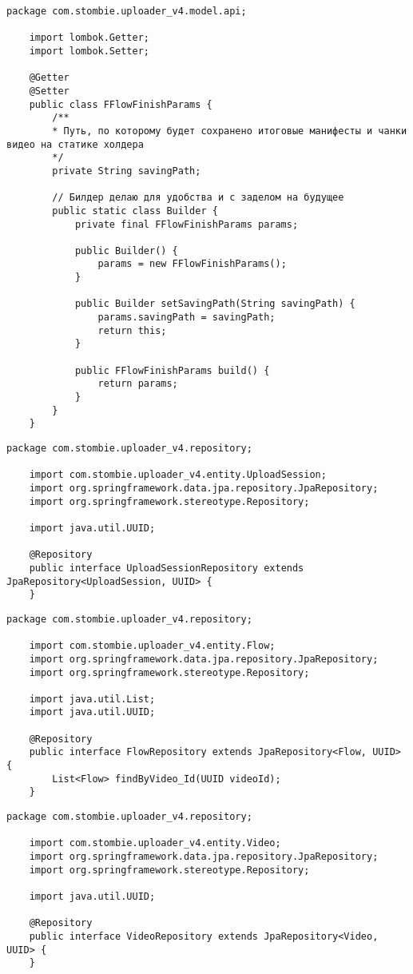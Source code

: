 \begin{lstlisting}[caption={FFlowFinishParams.java}]
	package com.stombie.uploader_v4.model.api;
	
	import lombok.Getter;
	import lombok.Setter;
	
	@Getter
	@Setter
	public class FFlowFinishParams {
		/**
		* Путь, по которому будет сохранено итоговые манифесты и чанки видео на статике холдера
		*/
		private String savingPath;
		
		// Билдер делаю для удобства и с заделом на будущее
		public static class Builder {
			private final FFlowFinishParams params;
			
			public Builder() {
				params = new FFlowFinishParams();
			}
			
			public Builder setSavingPath(String savingPath) {
				params.savingPath = savingPath;
				return this;
			}
			
			public FFlowFinishParams build() {
				return params;
			}
		}
	}
\end{lstlisting}

\begin{lstlisting}[caption={UploadSessionRepository.java}]
	package com.stombie.uploader_v4.repository;
	
	import com.stombie.uploader_v4.entity.UploadSession;
	import org.springframework.data.jpa.repository.JpaRepository;
	import org.springframework.stereotype.Repository;
	
	import java.util.UUID;
	
	@Repository
	public interface UploadSessionRepository extends JpaRepository<UploadSession, UUID> {
	}
\end{lstlisting}

\begin{lstlisting}[caption={FlowRepository.java}]
	package com.stombie.uploader_v4.repository;
	
	import com.stombie.uploader_v4.entity.Flow;
	import org.springframework.data.jpa.repository.JpaRepository;
	import org.springframework.stereotype.Repository;
	
	import java.util.List;
	import java.util.UUID;
	
	@Repository
	public interface FlowRepository extends JpaRepository<Flow, UUID> {
		List<Flow> findByVideo_Id(UUID videoId);
	}
\end{lstlisting}

\begin{lstlisting}[caption={VideoRepository.java}]
	package com.stombie.uploader_v4.repository;
	
	import com.stombie.uploader_v4.entity.Video;
	import org.springframework.data.jpa.repository.JpaRepository;
	import org.springframework.stereotype.Repository;
	
	import java.util.UUID;
	
	@Repository
	public interface VideoRepository extends JpaRepository<Video, UUID> {
	}
\end{lstlisting}

